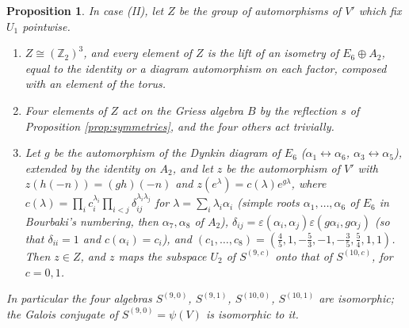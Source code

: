 \documentclass[leqno]{article}
\newcommand{\Z}{\ensuremath{\mathbb{Z}}}
\newcommand{\epsi}{\varepsilon}
\newtheorem{prop}[thm]{Proposition}
\numberwithin{equation}{section}
\begin{document}
\begin{prop}
\label{prop:centralizer-two}
In case (II), let $Z$ be the group of automorphisms of $V'$ which fix $U_1$ pointwise.
\begin{enumerate}
\item $Z \cong (\Z_2)^3$, and every element of $Z$ is the lift of an isometry of $E_6 \oplus A_2$, equal to the identity or a diagram automorphism on each factor, composed with an element of the torus.
\item Four elements of $Z$ act on the Griess algebra $B$ by the reflection $s$ of Proposition \ref{prop:symmetries}, and the four others act trivially.
\item Let $g$ be the automorphism of the Dynkin diagram of $E_6$ ($\alpha_1 \leftrightarrow \alpha_6$, $\alpha_3 \leftrightarrow \alpha_5$), extended by the identity on $A_2$, and let $z$ be the automorphism of $V'$ with $z(h(-n)) = (gh)(-n)$ and $z(e^\lambda) = c(\lambda)e^{g\lambda}$, where $c(\lambda) = \prod_i c_i^{\lambda_i}\prod_{i<j}\delta_{ij}^{\lambda_i\lambda_j}$ for $\lambda = \sum_i\lambda_i\alpha_i$ (simple roots $\alpha_1, \ldots, \alpha_6$ of $E_6$ in Bourbaki's numbering, then $\alpha_7, \alpha_8$ of $A_2$), $\delta_{ij} = \epsi(\alpha_i,\alpha_j)\epsi(g\alpha_i,g\alpha_j)$ (so that $\delta_{ii} = 1$ and $c(\alpha_i) = c_i$), and $(c_1,\ldots,c_8) = (\frac45, 1, -\frac53, -1, -\frac35, \frac54, 1, 1)$. Then $z \in Z$, and $z$ maps the subspace $U_2$ of $S^{(9,c)}$ onto that of $S^{(10,c)}$, for $c = 0, 1$.
\end{enumerate}
In particular the four algebras $S^{(9,0)}$, $S^{(9,1)}$, $S^{(10,0)}$, $S^{(10,1)}$ are isomorphic; the Galois conjugate of $S^{(9,0)} = \psi(V)$ is isomorphic to it.
\end{prop}
\end{document}
